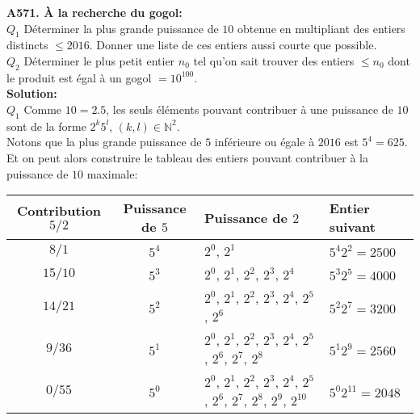 \documentclass[11pt] {article}
\newcommand{\N} {\mathbb{N}}
\begin{document}



\textbf{A571. À la recherche du gogol:}\\
$Q_{1}$ Déterminer la plus grande puissance de $10$ obtenue en multipliant des entiers distincts $\leq 2016$. Donner une liste de ces entiers aussi courte que possible.\\
$Q_{2}$ Déterminer le plus petit entier $n_{0}$ tel qu'on sait trouver des entiers $\leq n_{0}$ dont le produit est égal à un gogol $= 10^{100}$.\\

\textbf{Solution:}\\
$Q_{1}$ Comme $10 = 2.5$, les seuls éléments pouvant contribuer à une puissance de $10$ sont de la forme $2^{k}5^{l}$, $\left( k,l \right) \in \N^{2}$.\\

Notons que la plus grande puissance de $5$ inférieure ou égale à $2016$ est $5^{4} = 625$. Et on peut alors construire le tableau des entiers pouvant contribuer à la puissance de $10$ maximale:\\

\begin{center}
	\begin{tabular}{ccll}
		Contribution $5/2$	& Puissance de $5$	& Puissance de $2$																						& Entier suivant \\
		\hline
		$8/1$				& $5^{4}$				& $2^{0}$, $2^{1}$																						& $5^{4}2^{2} = 2500$ \\
		$15/10$				& $5^{3}$				& $2^{0}$, $2^{1}$, $2^{2}$, $2^{3}$, $2^{4}$															& $5^{3}2^{5} = 4000$ \\
		$14/21$				& $5^{2}$				& $2^{0}$, $2^{1}$, $2^{2}$, $2^{3}$, $2^{4}$, $2^{5}$, $2^{6}$											& $5^{2}2^{7} = 3200$ \\
		$9/36$				& $5^{1}$				& $2^{0}$, $2^{1}$, $2^{2}$, $2^{3}$, $2^{4}$, $2^{5}$, $2^{6}$, $2^{7}$, $2^{8}$						& $5^{1}2^{9} = 2560$ \\
		$0/55$				& $5^{0}$				& $2^{0}$, $2^{1}$, $2^{2}$, $2^{3}$, $2^{4}$, $2^{5}$, $2^{6}$, $2^{7}$, $2^{8}$, $2^{9}$, $2^{10}$	& $5^{0}2^{11} = 2048$ \\
	\end{tabular}
\end{center}
\end{document}
